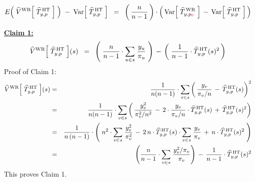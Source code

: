 \vskip 0.5cm
\begin{proposition}
\begin{equation*}
E\!\left(\;\widehat{V}^{\textnormal{WR}}\!\left[\;\widehat{T}^{\,\textnormal{HT}}_{y,p}\;\right]\;\right)
\; - \; \textnormal{Var}\!\left[\;\widehat{T}^{\,\textnormal{HT}}_{y,p}\;\right]
\;\; = \;\;
	\left(\,\dfrac{n}{n-1}\,\right)
	\cdot
	\left(\,
		\textnormal{Var}\!\left[\;\widehat{T}^{\,\textnormal{WR}}_{y,p_{\color{red}0}}\;\right]
		\, - \,
		\textnormal{Var}\!\left[\;\widehat{T}^{\,\textnormal{HT}}_{y,p}\;\right]
		\,\right)
\end{equation*}
\end{proposition}
\proof
\vskip 0.1cm
\noindent
\underline{\textbf{Claim 1:}}
\begin{equation*}
\widehat{V}^{\textnormal{WR}}\!\left[\;\widehat{T}^{\,\textnormal{HT}}_{y,p}\;\right]\!(s)
\;\; = \;\;
	\left(\;\dfrac{n}{n-1}\cdot\underset{u \in s}{\sum}\;\dfrac{y_{u}}{\pi_{u}}\;\right)
	\,-\,
	\left(\;\dfrac{1}{n-1}\cdot\widehat{T}^{\,\textnormal{HT}}_{y,p}(s)^{2}\,\right)
\end{equation*}
Proof of Claim 1:
\begin{eqnarray*}
\widehat{V}^{\textnormal{WR}}\!\left[\;\widehat{T}^{\,\textnormal{HT}}_{y,p}\;\right]\!(s)
& = &
	\dfrac{1}{n(n-1)}\cdot \underset{v \in s}{\sum} \left(\,
		\dfrac{y_{v}}{\pi_{v}/n}
		\, - \,
		\widehat{T}^{\,\textnormal{HT}}_{y,p}(s)
		\right)^{2}
\\
& = &
	\dfrac{1}{n(n-1)}\cdot \underset{v \in s}{\sum} \left(\,
		\dfrac{y_{v}^{2}}{\pi_{v}^{2}/n^{2}}
		\, - \,
		2 \cdot
		\dfrac{y_{v}}{\pi_{v}/n}
		\cdot
		\widehat{T}^{\,\textnormal{HT}}_{y,p}(s)
		\, + \,
		\widehat{T}^{\,\textnormal{HT}}_{y,p}(s)^{2}
		\right)
\\
& = &
	\dfrac{1}{n\,(n-1)} \cdot \left(\;
		n^{2} \cdot \underset{v \in s}{\sum}\;\dfrac{y_{v}^{2}}{\pi_{v}^{2}}
		\, - \,
		2\,n
		\cdot \widehat{T}^{\,\textnormal{HT}}_{y,p}(s) 
		\cdot \underset{v \in s}{\sum}\;\dfrac{y_{v}}{\pi_{v}}
		\, + \,
		n \cdot \widehat{T}^{\,\textnormal{HT}}_{y,p}(s)^{2}
		\;\right)
\\
& = &
	\left(\dfrac{n}{n-1}\cdot\underset{v \in s}{\sum}\;\dfrac{y_{v}^{2}/\pi_{v}}{\pi_{v}}\right)
	\, - \,
	\dfrac{1}{n-1} \cdot \widehat{T}^{\,\textnormal{HT}}_{y,p}(s)^{2}
\end{eqnarray*}
This proves Claim 1.

